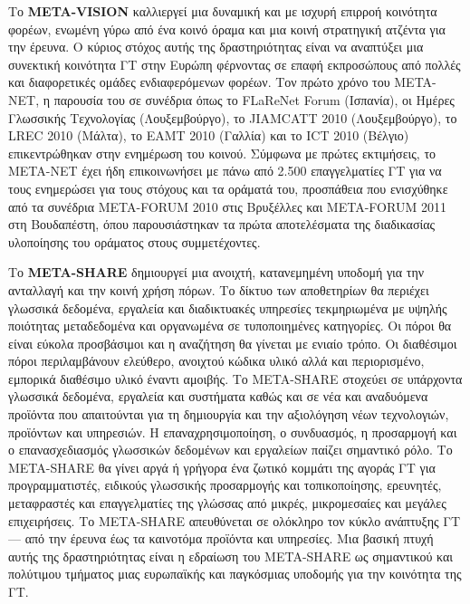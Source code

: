 \documentclass[]{../../metanetpaper}
\begin{document}
\begin{multicols}{2}
Το \textbf{META-VISION} καλλιεργεί μια δυναμική και με ισχυρή επιρροή κοινότητα φορέων, ενωμένη γύρω από ένα κοινό όραμα και μια κοινή στρατηγική ατζέντα για την έρευνα. Ο κύριος στόχος αυτής της δραστηριότητας είναι να αναπτύξει μια συνεκτική κοινότητα ΓΤ στην Ευρώπη φέρνοντας σε επαφή εκπροσώπους από πολλές και διαφορετικές ομάδες ενδιαφερόμενων φορέων. Τον πρώτο χρόνο του META-NET, η παρουσία του σε συνέδρια όπως το FLaReNet Forum (Ισπανία), οι Ημέρες Γλωσσικής Τεχνολογίας (Λουξεμβούργο), το JIAMCATT 2010 (Λουξεμβούργο), το LREC 2010 (Μάλτα), το EAMT 2010 (Γαλλία) και το ICT 2010 (Βέλγιο) επικεντρώθηκαν στην ενημέρωση του κοινού. Σύμφωνα με  πρώτες εκτιμήσεις, το META-NET έχει ήδη επικοινωνήσει με πάνω από 2.500 επαγγελματίες ΓΤ για να τους ενημερώσει για τους στόχους και τα οράματά του, προσπάθεια που ενισχύθηκε από τα συνέδρια META-FORUM 2010 στις Βρυξέλλες και META-FORUM 2011 στη Βουδαπέστη, όπου παρουσιάστηκαν τα πρώτα αποτελέσματα της διαδικασίας υλοποίησης του οράματος στους συμμετέχοντες.

Το \textbf{META-SHARE} δημιουργεί μια ανοιχτή, κατανεμημένη υποδομή για την ανταλλαγή και την κοινή χρήση πόρων. Το δίκτυο των αποθετηρίων θα περιέχει γλωσσικά δεδομένα, εργαλεία και διαδικτυακές υπηρεσίες τεκμηριωμένα με υψηλής ποιότητας μεταδεδομένα και οργανωμένα σε τυποποιημένες κατηγορίες. Οι πόροι θα είναι εύκολα προσβάσιμοι και η αναζήτηση θα γίνεται με ενιαίο τρόπο. Οι διαθέσιμοι πόροι περιλαμβάνουν ελεύθερο, ανοιχτού κώδικα υλικό αλλά και περιορισμένο, εμπορικά διαθέσιμο υλικό έναντι αμοιβής. Το META-SHARE στοχεύει σε υπάρχοντα γλωσσικά δεδομένα, εργαλεία και συστήματα καθώς και σε νέα και αναδυόμενα προϊόντα που απαιτούνται για τη δημιουργία και την αξιολόγηση νέων τεχνολογιών, προϊόντων και υπηρεσιών. Η επαναχρησιμοποίηση, ο συνδυασμός, η προσαρμογή και ο επανασχεδιασμός γλωσσικών δεδομένων και εργαλείων παίζει σημαντικό ρόλο. Το META-SHARE θα γίνει αργά ή γρήγορα ένα ζωτικό κομμάτι της αγοράς ΓΤ για  προγραμματιστές, ειδικούς γλωσσικής προσαρμογής και τοπικοποίησης, ερευνητές, μεταφραστές και επαγγελματίες της γλώσσας από μικρές, μικρομεσαίες και μεγάλες επιχειρήσεις. Το META-SHARE απευθύνεται σε ολόκληρο τον κύκλο ανάπτυξης ΓΤ — από την έρευνα έως τα καινοτόμα προϊόντα και υπηρεσίες. Μια βασική πτυχή αυτής της δραστηριότητας είναι η εδραίωση του META-SHARE ως σημαντικού και πολύτιμου τμήματος μιας ευρωπαϊκής και παγκόσμιας υποδομής για την κοινότητα της ΓΤ.


\end{multicols}
\end{document}
